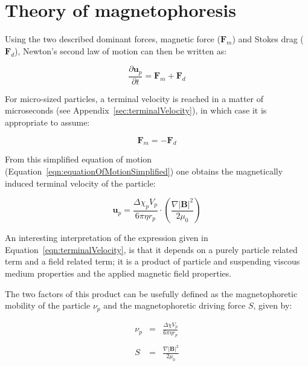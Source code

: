 
\section{Theory of magnetophoresis}\label{sec:theoryOfMagnetophoresis}
Using the two described dominant forces, magnetic force ($\mathbf{F}_{m}$) and Stokes drag ($\mathbf{F}_{d}$), Newton's second law of motion can then be written as:

\begin{equation}
	\frac{\partial \mathbf{u}_{p}}{\partial t} = \mathbf{F}_{m}+\mathbf{F}_{d}
	\label{eqn:equationOfMotion}
\end{equation}

For micro-sized particles, a terminal velocity is reached in a matter of microseconds (see Appendix~\ref{sec:terminalVelocity}), in which case it is appropriate to assume:

\begin{equation}
	\mathbf{F}_{m} = -\mathbf{F}_{d}
	\label{eqn:equationOfMotionSimplified}
\end{equation}

From this simplified equation of motion (Equation~\ref{eqn:equationOfMotionSimplified}) one obtains the magnetically induced terminal velocity of the particle:

\begin{equation}
	\mathbf{u}_{p} = \frac{\Delta\chi_{p} V_{p}}{6\pi\eta r_{p}} \cdot \left(\frac{\nabla |\mathbf{B}|^{2}}{2\mu_{0}}\right)
	\label{eqn:terminalVelocity}
\end{equation}

An interesting interpretation of the expression given in Equation~\ref{eqn:terminalVelocity}, is that it depends on a purely particle related term and a field related term; it is a product of particle and suspending viscous medium properties and the applied magnetic field properties. 

The two factors of this product can be usefully defined as the magnetophoretic mobility of the particle $\nu_{p}$ and the magnetophoretic driving force $S$, given by:

\begin{eqnarray}
		\nu_{p} &=& \frac{\Delta \chi V_{p}}{6\pi\eta r_{p}} \label{eqn:magnetophoreticMobility} \\ \nonumber \\
		S &=& \frac{\nabla |\mathbf{B}|^{2}}{2\mu_{0}}
		\label{eqn:magnetophoreticDrivingForce}
\end{eqnarray}

